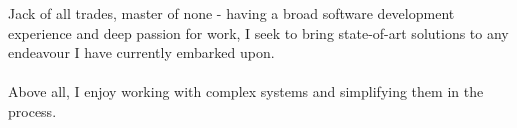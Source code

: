 \documentclass[9pt]{style/developercv}
\begin{document}
\begin{minipage}[t]{0.4\textwidth} %
	\vspace{-\baselineskip} %
	
	Jack of all trades, master of none - having a broad software development experience 
	and deep passion for work, I seek to bring state-of-art solutions to any endeavour
	I have currently embarked upon. \\ \\
	Above all, I enjoy working with complex systems and simplifying them in the process.

\end{minipage}
\hfill %
\begin{minipage}[t]{0.5\textwidth} %
	\vspace{-\baselineskip} %
	\begin{barchart}{5.5}
	\end{barchart}
\end{minipage}

\vspace{1cm}

\end{document}

